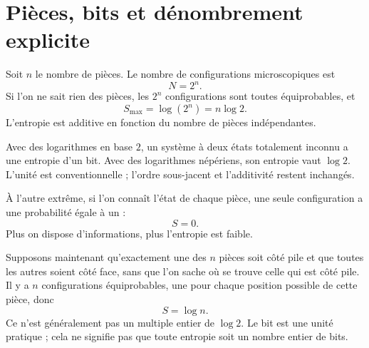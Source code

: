 \section{Pièces, bits et dénombrement explicite}

Soit \(n\) le nombre de pièces. Le nombre de configurations microscopiques est
\begin{equation}
 N=2^n.
 \label{eq:sm1-coin-state-count}
\end{equation}
Si l’on ne sait rien des pièces, les \(2^n\) configurations sont toutes équiprobables, et
\begin{equation}
 S_{\max}=\log(2^n)=n\log2.
 \label{eq:sm1-coin-max-entropy}
\end{equation}
L’entropie est additive en fonction du nombre de pièces indépendantes.

Avec des logarithmes en base \(2\), un système à deux états totalement inconnu a une entropie d’un bit. Avec des logarithmes népériens, son entropie vaut \(\log2\). L’unité est conventionnelle ; l’ordre sous-jacent et l’additivité restent inchangés.

À l’autre extrême, si l’on connaît l’état de chaque pièce, une seule configuration a une probabilité égale à un :
\begin{equation}
 S=0.
\end{equation}
Plus on dispose d’informations, plus l’entropie est faible.

Supposons maintenant qu’exactement une des \(n\) pièces soit côté pile et que toutes les autres soient côté face, sans que l’on sache où se trouve celle qui est côté pile. Il y a \(n\) configurations équiprobables, une pour chaque position possible de cette pièce, donc
\begin{equation}
 S=\log n.
 \label{eq:sm1-one-tail-entropy}
\end{equation}
Ce n’est généralement pas un multiple entier de \(\log2\). Le bit est une unité pratique ; cela ne signifie pas que toute entropie soit un nombre entier de bits.

\begin{classroomqa}
\end{classroomqa}

